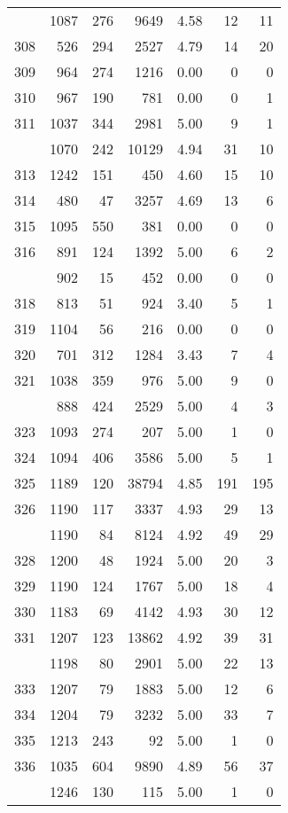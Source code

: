 \documentclass[
]{article}
\begin{document}
\begin{table}
\begin{tabular}[t]{lrrrrrr}
\addlinespace
307 & 1087 & 276 & 9649 & 4.58 & 12 & 11\\
308 & 526 & 294 & 2527 & 4.79 & 14 & 20\\
309 & 964 & 274 & 1216 & 0.00 & 0 & 0\\
310 & 967 & 190 & 781 & 0.00 & 0 & 1\\
311 & 1037 & 344 & 2981 & 5.00 & 9 & 1\\
\addlinespace
312 & 1070 & 242 & 10129 & 4.94 & 31 & 10\\
313 & 1242 & 151 & 450 & 4.60 & 15 & 10\\
314 & 480 & 47 & 3257 & 4.69 & 13 & 6\\
315 & 1095 & 550 & 381 & 0.00 & 0 & 0\\
316 & 891 & 124 & 1392 & 5.00 & 6 & 2\\
\addlinespace
317 & 902 & 15 & 452 & 0.00 & 0 & 0\\
318 & 813 & 51 & 924 & 3.40 & 5 & 1\\
319 & 1104 & 56 & 216 & 0.00 & 0 & 0\\
320 & 701 & 312 & 1284 & 3.43 & 7 & 4\\
321 & 1038 & 359 & 976 & 5.00 & 9 & 0\\
\addlinespace
322 & 888 & 424 & 2529 & 5.00 & 4 & 3\\
323 & 1093 & 274 & 207 & 5.00 & 1 & 0\\
324 & 1094 & 406 & 3586 & 5.00 & 5 & 1\\
325 & 1189 & 120 & 38794 & 4.85 & 191 & 195\\
326 & 1190 & 117 & 3337 & 4.93 & 29 & 13\\
\addlinespace
327 & 1190 & 84 & 8124 & 4.92 & 49 & 29\\
328 & 1200 & 48 & 1924 & 5.00 & 20 & 3\\
329 & 1190 & 124 & 1767 & 5.00 & 18 & 4\\
330 & 1183 & 69 & 4142 & 4.93 & 30 & 12\\
331 & 1207 & 123 & 13862 & 4.92 & 39 & 31\\
\addlinespace
332 & 1198 & 80 & 2901 & 5.00 & 22 & 13\\
333 & 1207 & 79 & 1883 & 5.00 & 12 & 6\\
334 & 1204 & 79 & 3232 & 5.00 & 33 & 7\\
335 & 1213 & 243 & 92 & 5.00 & 1 & 0\\
336 & 1035 & 604 & 9890 & 4.89 & 56 & 37\\
\addlinespace
337 & 1246 & 130 & 115 & 5.00 & 1 & 0\\

\end{tabular}
\end{table}
\end{document}
